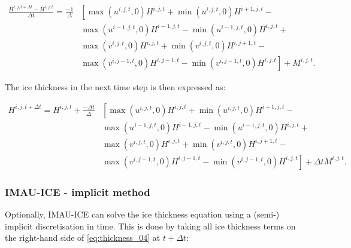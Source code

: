 \documentclass{article}
\begin{document}
\begin{equation} \label{eq:thickness_04}
\begin{split}
\frac{H^{i,j,t+\Delta t} - H^{i,j,t}}{\Delta t} = \frac{-1}{\Delta} & \left[ 
\max \left( u^{i,j,t},0 \right) H^{i,j,t} + \min \left( u^{i,j,t},0 \right) H^{i+1,j,t} \right. - \\
& \left. \max \left( u^{i-1,j,t},0 \right) H^{i-1,j,t} - \min \left( u^{i-1,j,t},0 \right) H^{i,j,t} \right. + \\
& \left. \max \left( v^{i,j,t},0 \right) H^{i,j,t} + \min \left( v^{i,j,t},0 \right) H^{i,j+1,t} \right. - \\
& \left. \max \left( v^{i,j-1,t},0 \right) H^{i,j-1,t} - \min \left( v^{i,j-1,t},0 \right) H^{i,j,t} \right]
+ M^{i,j,t}.
\end{split}
\end{equation}

The ice thickness in the next time step is then expressed as:

\begin{equation} \label{eq:thickness_05}
\begin{split}
H^{i,j,t+\Delta t} = H^{i,j,t} + \frac{-\Delta t}{\Delta} & \left[ 
\max \left( u^{i,j,t},0 \right) H^{i,j,t} + \min \left( u^{i,j,t},0 \right) H^{i+1,j,t} \right. - \\
& \left. \max \left( u^{i-1,j,t},0 \right) H^{i-1,j,t} - \min \left( u^{i-1,j,t},0 \right) H^{i,j,t} \right. + \\
& \left. \max \left( v^{i,j,t},0 \right) H^{i,j,t} + \min \left( v^{i,j,t},0 \right) H^{i,j+1,t} \right. - \\
& \left. \max \left( v^{i,j-1,t},0 \right) H^{i,j-1,t} - \min \left( v^{i,j-1,t},0 \right) H^{i,j,t} \right]
+ \Delta t M^{i,j,t}.
\end{split}
\end{equation}

\subsubsection{IMAU-ICE - implicit method}

Optionally, IMAU-ICE can solve the ice thickness equation using a (semi-) implicit discretisation in time. This is done by taking all ice thickness terms on the right-hand side of \eqref{eq:thickness_04} at $t+\Delta t$:
\end{document}

